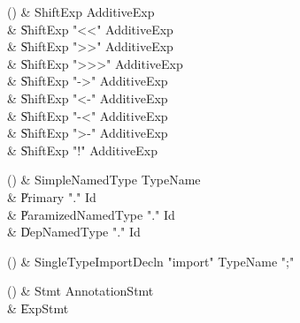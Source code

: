 \begin{bbgrammarappendix}{4.2in}

() & ShiftExp \label{prod:ShiftExp}  \: AdditiveExp  \\

 &    \| ShiftExp \xcd"<<" AdditiveExp \\
 &    \| ShiftExp \xcd">>" AdditiveExp \\
 &    \| ShiftExp \xcd">>>" AdditiveExp \\
 &    \| ShiftExp  \xcd"->" AdditiveExp  \\
 &    \| ShiftExp  \xcd"<-" AdditiveExp  \\
 &    \| ShiftExp  \xcd"-<" AdditiveExp  \\
 &    \| ShiftExp  \xcd">-" AdditiveExp  \\
 &    \| ShiftExp  \xcd"!" AdditiveExp  \\

\end{bbgrammarappendix}

\begin{bbgrammarappendix}{3.5in}

() & SimpleNamedType \label{prod:SimpleNamedType}  \: TypeName  \\

 &    \| Primary \xcd"." Id \\
 &    \| ParamizedNamedType \xcd"." Id \\
 &    \| DepNamedType \xcd"." Id \\

\end{bbgrammarappendix}

\begin{bbgrammarappendix}{2.9in}

() & SingleTypeImportDecln \label{prod:SingleTypeImportDecln}  \: \xcd"import" TypeName \xcd";"  \\


\end{bbgrammarappendix}

\begin{bbgrammarappendix}{4.6in}

() & Stmt \label{prod:Stmt}  \: AnnotationStmt  \\

 &    \| ExpStmt \\

\end{bbgrammarappendix}

